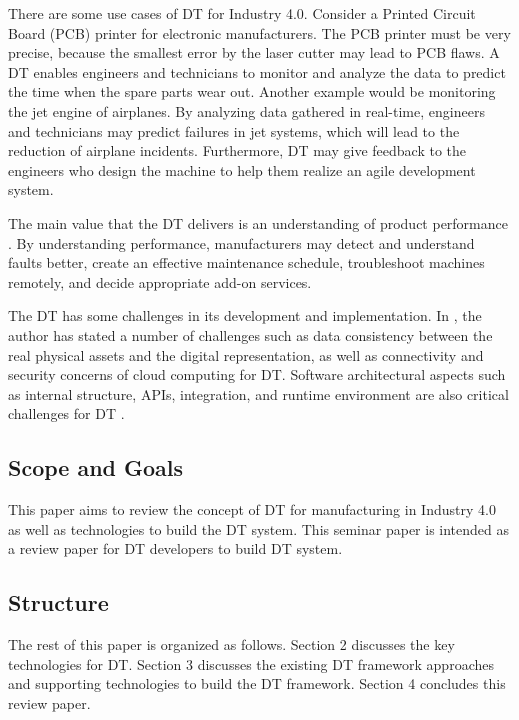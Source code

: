 \documentclass[article,table]{aaltoseries}
\begin{document}
There are some use cases of DT for Industry 4.0. Consider a Printed Circuit Board (PCB) printer for electronic manufacturers. The PCB printer must be very precise, because the smallest error by the laser cutter may lead to PCB flaws. A DT enables engineers and technicians to monitor and analyze the data to predict the time when the spare parts wear out. Another example would be monitoring the jet engine of airplanes. By analyzing data gathered in real-time, engineers and technicians may predict failures in jet systems, which will lead to the reduction of airplane incidents. Furthermore, DT may give feedback to the engineers who design the machine to help them realize an agile development system.

The main value that the DT delivers is an understanding of product performance \cite{Cheatshe3:online}. By understanding performance, manufacturers may detect and understand faults better, create an effective maintenance schedule, troubleshoot machines remotely, and decide appropriate add-on services.

The DT has some challenges in its development and implementation. In \cite{bienhaus2017patterns}, the author has stated a number of challenges such as data consistency between the real physical assets and the digital representation, as well as connectivity and security concerns of cloud computing for DT. Software architectural aspects such as internal structure, APIs, integration, and runtime environment are also critical challenges for DT \cite{malakuti2018architectural}.

\subsection{Scope and Goals}
\label{sec:emphasis}
This paper aims to review the concept of DT for manufacturing in Industry 4.0 as well as technologies to build the DT system. This seminar paper is intended as a review paper for DT developers to build DT system.

\subsection{Structure}
\label{sec:em}
The rest of this paper is organized as follows. Section 2 discusses the key technologies for DT. Section 3 discusses the existing DT framework approaches and supporting technologies to build the DT framework. Section 4 concludes this review paper.
 

\end{document}
